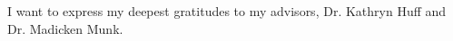 
I want to express my deepest gratitudes to my advisors, Dr. Kathryn Huff and Dr. 
Madicken Munk. 











